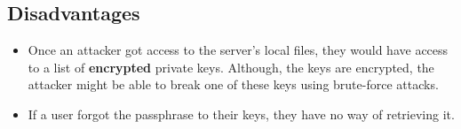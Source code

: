 \subsection{Disadvantages}
\begin{itemize}
	\item Once an attacker got access to the server's local files, they would have access to a list of \textbf{encrypted} private keys. Although, the keys are encrypted, the attacker might be able to break one of these keys using brute-force attacks.
	\item If a user forgot the passphrase to their keys, they have no way of retrieving it.
\end{itemize}